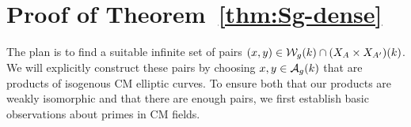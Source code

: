 \documentclass{amsart}
\begin{document}




\section{Proof of Theorem~\ref{thm:Sg-dense}}
\label{sec:step-2}


The plan is to find a suitable infinite set of pairs $(x,y) \in \mathcal{W}_g(k) \cap (X_A \times X_{A'})(k)$. We will explicitly construct these pairs by choosing $x,y \in \mathcal{A}_g(k)$ that are products of isogenous CM elliptic curves. To ensure both that our products are weakly isomorphic and that there are enough pairs, we first establish basic observations about primes in CM fields.

\end{document}
